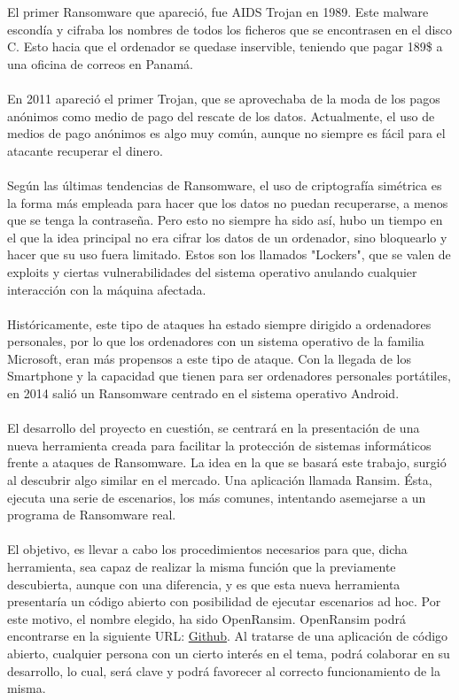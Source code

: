 \documentclass[a4paper,12pt]{article}
\begin{document}
El primer Ransomware que apareció, fue AIDS Trojan en 1989. Este malware escondía y cifraba los nombres de todos los ficheros que se encontrasen en el disco C. Esto hacia que el ordenador se quedase inservible, teniendo que pagar 189\$ a una oficina de correos en Panamá.\\\\
En 2011 apareció el primer Trojan, que se aprovechaba de la moda de los pagos anónimos como medio de pago del rescate de los datos. Actualmente, el uso de medios de pago anónimos es algo muy común, aunque no siempre es fácil para el atacante recuperar el dinero.\\\\
Según las últimas tendencias de Ransomware, el uso de criptografía simétrica es la forma más empleada para hacer que los datos no puedan recuperarse, a menos que se tenga la contraseña. Pero esto no siempre ha sido así, hubo un tiempo en el que la idea principal no era cifrar los datos de un ordenador, sino bloquearlo y hacer que su uso fuera limitado. Estos son los llamados "Lockers", que se valen de exploits y ciertas vulnerabilidades del sistema operativo anulando cualquier interacción con la máquina afectada.\\\\
Históricamente, este tipo de ataques ha estado siempre dirigido a ordenadores personales, por lo que los ordenadores con un sistema operativo de la familia Microsoft, eran más propensos a este tipo de ataque. Con la llegada de los Smartphone y la capacidad que tienen para ser ordenadores personales portátiles, en 2014 salió un Ransomware centrado en el sistema operativo Android.\\\\
El desarrollo del proyecto en cuestión, se centrará en la presentación de una nueva herramienta creada para facilitar la protección de sistemas informáticos frente a ataques de Ransomware. La idea en la que se basará este trabajo, surgió al descubrir algo similar en el mercado. Una aplicación llamada Ransim. Ésta, ejecuta una serie de escenarios, los más comunes, intentando asemejarse a un programa de Ransomware real.\\\\
El objetivo, es llevar a cabo los procedimientos necesarios para que, dicha herramienta, sea capaz de realizar la misma función que la previamente descubierta, aunque con una diferencia, y es que esta nueva herramienta presentaría un código abierto con posibilidad de ejecutar escenarios ad hoc. Por este motivo, el nombre elegido, ha sido OpenRansim. OpenRansim podrá encontrarse en la siguiente URL: \href{https://github.com/iserranos/OpenRansim}{Github}. 
Al tratarse de una aplicación de código abierto, cualquier persona con un cierto interés en el tema, podrá colaborar en su desarrollo, lo cual, será clave y podrá favorecer al correcto funcionamiento de la misma.
\end{document}
